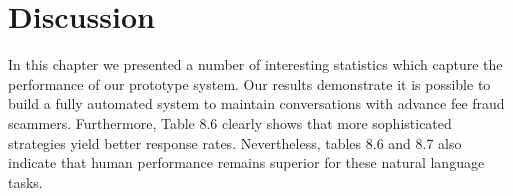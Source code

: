 \begin{table}[h]
  \centering
\caption{Distribution of incoming messages by class}
\end{table}

\section{Discussion}
In this chapter we presented a number of interesting statistics which capture the performance of our prototype system. Our results demonstrate it is possible to build a fully automated system
to maintain conversations with advance fee fraud scammers. Furthermore, Table 8.6 clearly shows that more sophisticated strategies yield better response rates. Nevertheless, tables 8.6 and 8.7 also indicate that human performance remains superior for these natural language tasks.

